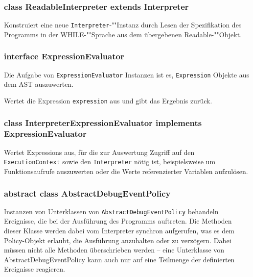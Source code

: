 \subsubsection{class ReadableInterpreter extends Interpreter}

\begin{description}
    Konstruiert eine neue \texttt{Interpreter}-""Instanz durch Lesen der Spezifikation des Programms in der WHILE-""Sprache aus dem übergebenen Readable-""Objekt.
\end{description}


\subsubsection{interface ExpressionEvaluator}
Die Aufgabe von \texttt{ExpressionEvaluator} Instanzen ist es, \texttt{Expression} Objekte aus dem AST auszuwerten.
\begin{description}
    Wertet die Expression \texttt{expression} aus und gibt das Ergebnis zurück.
\end{description}

\subsubsection{class InterpreterExpressionEvaluator implements ExpressionEvaluator}
Wertet Expressions aus, für die zur Auswertung Zugriff auf den \texttt{ExecutionContext} sowie den \texttt{Interpreter} nötig ist, beispielsweise um Funktionsaufrufe auszuwerten oder die Werte referenzierter Variablen aufzulösen.

\subsubsection{abstract class AbstractDebugEventPolicy}
Instanzen von Unterklassen von \texttt{AbstractDebugEventPolicy} behandeln Ereignisse, die bei der Ausführung des Programms auftreten. Die Methoden dieser Klasse werden dabei vom Interpreter synchron aufgerufen, was es dem Policy-Objekt erlaubt, die Ausführung anzuhalten oder zu verzögern. Dabei müssen nicht alle Methoden überschrieben werden -- eine Unterklasse von AbstractDebugEventPolicy kann auch nur auf eine Teilmenge der definierten Ereignisse reagieren.

